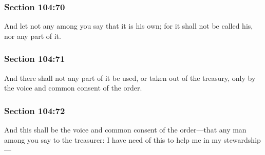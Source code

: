 	\subsubsection{Section 104:70} %
		\label{DC104-70}

		And let not any among you say that it is his own; for it shall not be called his, nor any part of it.


	\subsubsection{Section 104:71} %
		\label{DC104-71}

		And there shall not any part of it be used, or taken out of the treasury, only by the voice and common consent of the order.


	\subsubsection{Section 104:72} %
		\label{DC104-72}

		And this shall be the voice and common consent of the order---that any man among you say to the treasurer: I have need of this to help me in my stewardship---



